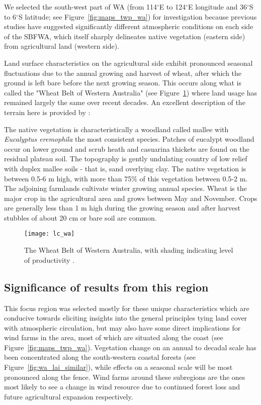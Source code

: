 We selected the south-west part of \ac{WA} (from 114$^\circ$E to 124$^\circ$E longitude and 36$^\circ$S to 6$^\circ$S latitude; see Figure~\ref{fig:maps_twp_wa}) for investigation because previous studies \citep{lyons1993, lyons1996, lyons2002, xinmei1995, ray2003, esau2002} have suggested significantly different atmospheric conditions on each side of the \ac{SBFWA}, which itself sharply delineates native vegetation (eastern side) from agricultural land (western side).

Land surface characteristics on the agricultural side exhibit pronounced seasonal fluctuations due to the annual growing and harvest of wheat, after which the ground is left bare before the next growing season. This occurs along what is called the "Wheat Belt of Western Australia" (see Figure~\ref{fig:lc_wa}) where land usage has remained largely the same over recent decades. An excellent description of the terrain here is provided by \citet{lyons2002}:

\begin{displayquote}
	The native vegetation is characteristically a woodland called mallee with \textit{Eucalyptus eremophila} the most consistent species. Patches of eucalypt woodland occur on lower ground and scrub heath and casuarina thickets are found on the residual plateau soil. The topography is gently undulating country of low relief with duplex mallee soils - that is, sand overlying clay. The native vegetation is between 0.5-6 m high, with more than 75\% of this vegetation between 0.5-2 m. The adjoining farmlands cultivate winter growing annual species. Wheat is the major crop in the agricultural area and grows between May and November. Crops are generally less than 1 m high during the growing season and after harvest stubbles of about 20 cm or bare soil are common.
\end{displayquote}

\begin{figure}[!ht]
	\centering
	\texttt{[image: lc\_wa]}
	\caption[Western Australia Land Usage]{The Wheat Belt of Western Australia, with shading indicating level of productivity \citep{dpird_2021}.}
	\label{fig:lc_wa}
\end{figure}

\subsection{Significance of results from this region}

This focus region was selected mostly for these unique characteristics which are conducive towards eliciting insights into the general principles tying land cover with atmospheric circulation, but may also have some direct implications for wind farms in the area, most of which are situated along the coast (see Figure~\ref{fig:maps_twp_wa}). Vegetation change on an annual to decadal scale has been concentrated along the south-western coastal forests (see Figure~\ref{fig:wa_lai_similar}), while effects on a seasonal scale will be most pronounced along the fence. Wind farms around these subregions are the ones most likely to see a change in wind resource due to continued forest loss and future agricultural expansion respectively.

